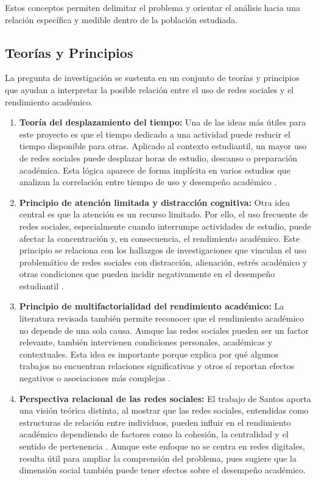 \documentclass[12pt]{article}
\begin{document}
Estos conceptos permiten delimitar el problema y orientar el análisis hacia una relación
específica y medible dentro de la población estudiada.

\subsection{Teorías y Principios}

La pregunta de investigación se sustenta en un conjunto de teorías y principios que ayudan a
interpretar la posible relación entre el uso de redes sociales y el rendimiento académico.

\begin{enumerate}
    \item \textbf{Teoría del desplazamiento del tiempo:} Una de las ideas más útiles para este
    proyecto es que el tiempo dedicado a una actividad puede reducir el tiempo disponible para
    otras. Aplicado al contexto estudiantil, un mayor uso de redes sociales puede desplazar horas
    de estudio, descanso o preparación académica. Esta lógica aparece de forma implícita en varios
    estudios que analizan la correlación entre tiempo de uso y desempeño académico
    \cite{leon2023,rodelomoreno2018,pasato2022,zarate2022}.

    \item \textbf{Principio de atención limitada y distracción cognitiva:} Otra idea central es que
    la atención es un recurso limitado. Por ello, el uso frecuente de redes sociales, especialmente
    cuando interrumpe actividades de estudio, puede afectar la concentración y, en consecuencia,
    el rendimiento académico. Este principio se relaciona con los hallazgos de investigaciones que
    vinculan el uso problemático de redes sociales con distracción, alienación, estrés académico
    y otras condiciones que pueden incidir negativamente en el desempeño estudiantil
    \cite{aljemely2020,ramirez2023,sotelo2023,miranda2023}.

    \item \textbf{Principio de multifactorialidad del rendimiento académico:} La literatura revisada
    también permite reconocer que el rendimiento académico no depende de una sola causa. Aunque
    las redes sociales pueden ser un factor relevante, también intervienen condiciones personales,
    académicas y contextuales. Esta idea es importante porque explica por qué algunos trabajos no
    encuentran relaciones significativas y otros sí reportan efectos negativos o asociaciones más
    complejas \cite{leon2023,aljemely2020,ramirez2023,miranda2023}.

    \item \textbf{Perspectiva relacional de las redes sociales:} El trabajo de Santos aporta una visión
    teórica distinta, al mostrar que las redes sociales, entendidas como estructuras de relación
    entre individuos, pueden influir en el rendimiento académico dependiendo de factores como la
    cohesión, la centralidad y el sentido de pertenencia \cite{santos2010}. Aunque este enfoque no
    se centra en redes digitales, resulta útil para ampliar la comprensión del problema, pues sugiere
    que la dimensión social también puede tener efectos sobre el desempeño académico.
\end{enumerate}
\end{document}
